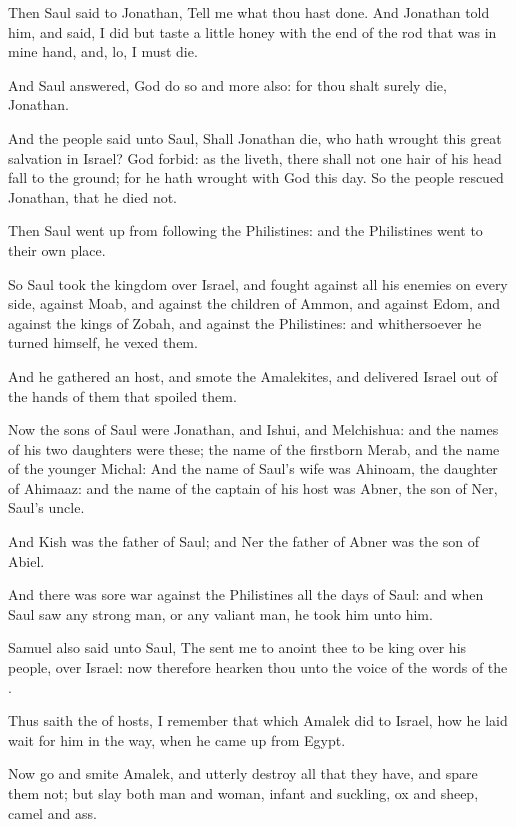 \Verse Then Saul said to Jonathan, Tell me what thou hast done. And Jonathan told him, and said, I did but taste a little honey with the end of the rod that was in mine hand, and, lo, I must die.

\Verse And Saul answered, God do so and more also: for thou shalt surely die, Jonathan.

\Verse And the people said unto Saul, Shall Jonathan die, who hath wrought this great salvation in Israel? God forbid: as the \LORD liveth, there shall not one hair of his head fall to the ground; for he hath wrought with God this day. So the people rescued Jonathan, that he died not.

\Verse Then Saul went up from following the Philistines: and the Philistines went to their own place.

\Verse So Saul took the kingdom over Israel, and fought against all his enemies on every side, against Moab, and against the children of Ammon, and against Edom, and against the kings of Zobah, and against the Philistines: and whithersoever he turned himself, he vexed them.

\Verse And he gathered an host, and smote the Amalekites, and delivered Israel out of the hands of them that spoiled them.

\Verse Now the sons of Saul were Jonathan, and Ishui, and Melchishua: and the names of his two daughters were these; the name of the firstborn Merab, and the name of the younger Michal: \Verse And the name of Saul's wife was Ahinoam, the daughter of Ahimaaz: and the name of the captain of his host was Abner, the son of Ner, Saul's uncle.

\Verse And Kish was the father of Saul; and Ner the father of Abner was the son of Abiel.

\Verse And there was sore war against the Philistines all the days of Saul: and when Saul saw any strong man, or any valiant man, he took him unto him.


\Chapter
\Verse Samuel also said unto Saul, The \LORD sent me to anoint thee to be king over his people, over Israel: now therefore hearken thou unto the voice of the words of the \LORD.

\Verse Thus saith the \LORD of hosts, I remember that which Amalek did to Israel, how he laid wait for him in the way, when he came up from Egypt.

\Verse Now go and smite Amalek, and utterly destroy all that they have, and spare them not; but slay both man and woman, infant and suckling, ox and sheep, camel and ass.

